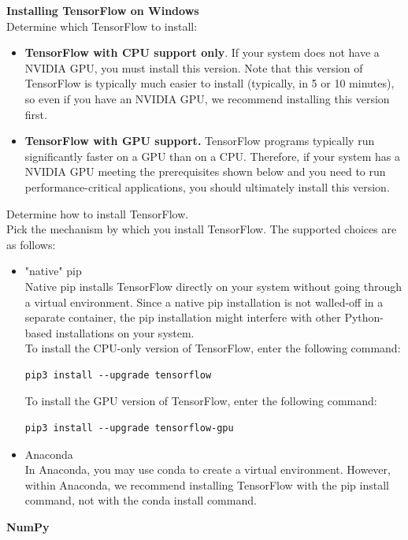 \noindent\textbf{Installing TensorFlow on Windows}\\Determine which TensorFlow to install:
\begin{itemize}
	\item \textbf{TensorFlow with CPU support only}. If your system does not have a NVIDIA GPU, you must install this version. Note that this version of TensorFlow is typically much easier to install (typically, in 5 or 10 minutes), so even if you have an NVIDIA GPU, we recommend installing this version first.
	\item \textbf{TensorFlow with GPU support.} TensorFlow programs typically run significantly faster on a GPU than on a CPU. Therefore, if your system has a NVIDIA GPU meeting the prerequisites shown below and you need to run performance-critical applications, you should ultimately install this version.
\end{itemize}
Determine how to install TensorFlow.\\ Pick the mechanism by which you install TensorFlow. The supported choices are as follows:
\begin{itemize}
	\item "native" pip\\Native pip installs TensorFlow directly on your system without going through a virtual environment. Since a native pip installation is not walled-off in a separate container, the pip installation might interfere with other Python-based installations on your system.\\
	To install the CPU-only version of TensorFlow, enter the following command:
	\begin{lstlisting}
pip3 install --upgrade tensorflow
	\end{lstlisting}
	To install the GPU version of TensorFlow, enter the following command:
	\begin{lstlisting}
pip3 install --upgrade tensorflow-gpu
	\end{lstlisting}
	\item Anaconda\\In Anaconda, you may use conda to create a virtual environment. However, within Anaconda, we recommend installing TensorFlow with the pip install command, not with the conda install command.
\end{itemize}
\textbf{{\Large NumPy}}
